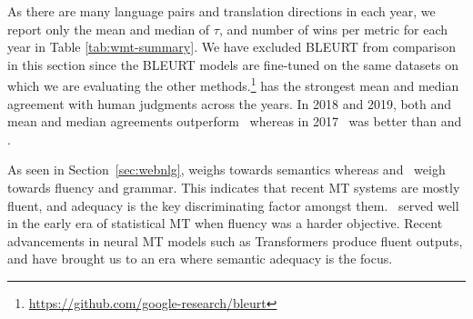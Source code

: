 As there are many language pairs and translation directions in each year, we report only the mean and median of $\tau$, and number of wins per metric for each year in Table \ref{tab:wmt-summary}.
We have excluded BLEURT from comparison in this section since the BLEURT models are fine-tuned on the same datasets on which we are evaluating the other methods.\footnote{\url{https://github.com/google-research/bleurt}}
 has the strongest mean and median agreement with human judgments across the years.
In 2018 and 2019, both  and  mean and median agreements outperform \bleu\, whereas in 2017 \bleu\ was better than  and .


As seen in Section~\ref{sec:webnlg},  weighs towards semantics whereas  and \bleu\ weigh towards fluency and grammar.
This indicates that recent MT systems are mostly fluent, and adequacy is the key discriminating factor amongst them.
\bleu\ served well in the early era of statistical MT when fluency was a harder objective. 
Recent advancements in neural MT models such as Transformers \cite{vaswani2017attention} produce fluent outputs, and have brought us to an era where semantic adequacy is the focus.



